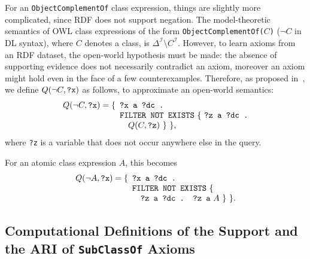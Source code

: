 \documentclass{sig-alternate}
\newcommand{\todo}[1]{\par\framebox{\parbox{3in}{#1}}\par}
\begin{document}
For an \texttt{ObjectComplementOf} class expression, things are slightly more complicated, since RDF does not support
negation. The model-theoretic semantics of OWL class expressions of the form \texttt{ObjectComplementOf(}$C$\texttt{)}
($\neg C$ in DL syntax), where $C$ denotes a class, is $\Delta^\mathcal{I} \setminus C^\mathcal{I}$.
However, to learn axioms from an RDF dataset, the open-world hypothesis must be made: the absence of
supporting evidence does not necessarily contradict an axiom, moreover an axiom might
hold even in the face of a few counterexamples.
Therefore, as proposed in~\cite{TettamanziFaronZuckerGandon2014ekaw}, we define
$Q(\neg C, \mbox{\tt ?x})$ as follows, to approximate an open-world semantics:
\begin{equation}\label{eq:approx-open-world-negation}
  Q(\neg C, \mbox{\tt ?x}) =
  \begin{minipage}[t]{2in}
    \begin{tabbing}
      \quad\=\quad\=\quad\=\kill
      \{\>\texttt{?x a ?dc .}\\
        \>\texttt{FILTER NOT EXISTS} \{ \texttt{?z a ?dc . }\\
        \>\>$Q(C, \mbox{\tt ?z})$ \} \},
    \end{tabbing}
  \end{minipage}
\end{equation}
where \texttt{?z} is a variable that does not occur anywhere else in the query.

For an atomic class expression $A$, this becomes
\begin{equation}
Q(\neg A, \mbox{\tt ?x}) =
  \begin{minipage}[t]{3in}
    \begin{tabbing}
      \quad\=\quad\=\quad\=\kill
      \{\>\texttt{?x a ?dc .}\\
        \>\texttt{FILTER NOT EXISTS} \{\\
        \>\>\texttt{?z a ?dc . ?z a} $A$ \} \}.
    \end{tabbing}
  \end{minipage}
\end{equation}


\subsection{Computational Definitions of the Support and the ARI of \texttt{SubClassOf} Axioms}
\label{comp-def-content}
\end{document}
